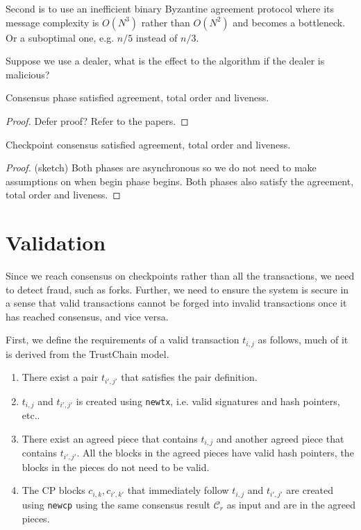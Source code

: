 Second is to use an inefficient binary Byzantine agreement protocol where its
message complexity is $O(N^3)$ rather than $O(N^2)$ and becomes a bottleneck. Or
a suboptimal one, e.g. $n/5$ instead of $n/3$.

Suppose we use a dealer, what is the effect to the algorithm if the dealer is
malicious?

\begin{lemma}
  Consensus phase satisfied agreement, total order and liveness.
\end{lemma}
\begin{proof}
  Defer proof? Refer to the papers.
\end{proof}

\begin{theorem}
  Checkpoint consensus satisfied agreement, total order and liveness.
\end{theorem}
\begin{proof}
  (sketch) Both phases are asynchronous so we do not need to make assumptions on
  when begin phase begins. Both phases also satisfy the agreement, total order
  and liveness.
\end{proof}

\section{Validation}\label{sec:validation}

Since we reach consensus on checkpoints rather than all the transactions, we
need to detect fraud, such as forks. Further, we need to ensure the system is
secure in a sense that valid transactions cannot be forged into invalid
transactions once it has reached consensus, and vice versa.

First, we define the requirements of a valid transaction $t_{i,j}$ as follows,
much of it is derived from the TrustChain model.

\begin{enumerate}
\item There exist a pair $t_{i', j'}$ that satisfies the pair definition.
\item $t_{i,j}$ and $t_{i', j'}$ is created using \texttt{newtx}, i.e. valid
  signatures and hash pointers, etc..
\item There exist an agreed piece that contains $t_{i, j}$ and another agreed
  piece that contains $t_{i', j'}$. All the blocks in the agreed pieces have
  valid hash pointers, the blocks in the pieces do not need to be valid.
\item The CP blocks $c_{i, k}, c_{i', k'}$ that immediately follow $t_{i, j}$
  and $t_{i', j'}$ are created using \texttt{newcp} using the same consensus
  result $\mathcal{C}_r$ as input and are in the agreed pieces.
\end{enumerate}

